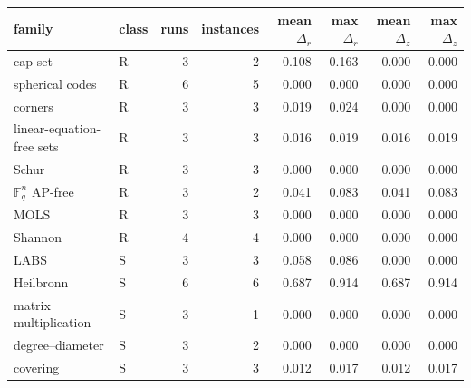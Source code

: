 \begin{tabular}{@{}llrrrrrr@{}}
\toprule
family & class & runs & instances & mean $\Delta_r$ & max $\Delta_r$ & mean $\Delta_z$ & max $\Delta_z$ \\
\midrule
cap set & R & 3 & 2 & 0.108 & 0.163 & 0.000 & 0.000 \\
spherical codes & R & 6 & 5 & 0.000 & 0.000 & 0.000 & 0.000 \\
corners & R & 3 & 3 & 0.019 & 0.024 & 0.000 & 0.000 \\
linear-equation-free sets & R & 3 & 3 & 0.016 & 0.019 & 0.016 & 0.019 \\
Schur & R & 3 & 3 & 0.000 & 0.000 & 0.000 & 0.000 \\
$\mathbb{F}_q^n$ AP-free & R & 3 & 2 & 0.041 & 0.083 & 0.041 & 0.083 \\
MOLS & R & 3 & 3 & 0.000 & 0.000 & 0.000 & 0.000 \\
Shannon & R & 4 & 4 & 0.000 & 0.000 & 0.000 & 0.000 \\
\midrule
LABS & S & 3 & 3 & 0.058 & 0.086 & 0.000 & 0.000 \\
Heilbronn & S & 6 & 6 & 0.687 & 0.914 & 0.687 & 0.914 \\
matrix multiplication & S & 3 & 1 & 0.000 & 0.000 & 0.000 & 0.000 \\
degree--diameter & S & 3 & 2 & 0.000 & 0.000 & 0.000 & 0.000 \\
covering & S & 3 & 3 & 0.012 & 0.017 & 0.012 & 0.017 \\
\bottomrule
\end{tabular}
